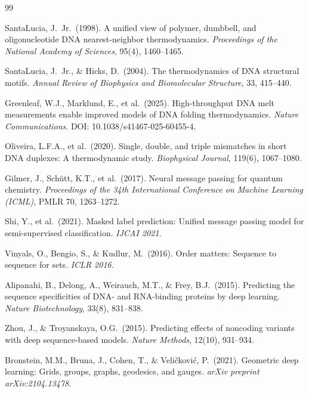 \documentclass[12pt,oneside,letterpaper]{report}
\begin{document}
\clearpage
\begin{singlespace}
\begin{thebibliography}{99}
\setlength{\itemsep}{1em}

SantaLucia, J.\ Jr.\ (1998).
A unified view of polymer, dumbbell, and oligonucleotide DNA nearest-neighbor thermodynamics.
\textit{Proceedings of the National Academy of Sciences}, 95(4), 1460--1465.

SantaLucia, J.\ Jr., \& Hicks, D.\ (2004).
The thermodynamics of DNA structural motifs.
\textit{Annual Review of Biophysics and Biomolecular Structure}, 33, 415--440.

Greenleaf, W.J., Marklund, E., et al.\ (2025).
High-throughput DNA melt measurements enable improved models of DNA folding thermodynamics.
\textit{Nature Communications}. DOI: 10.1038/s41467-025-60455-4.

Oliveira, L.F.A., et al.\ (2020).
Single, double, and triple mismatches in short DNA duplexes: A thermodynamic study.
\textit{Biophysical Journal}, 119(6), 1067--1080.

Gilmer, J., Schütt, K.T., et al.\ (2017).
Neural message passing for quantum chemistry.
\textit{Proceedings of the 34th International Conference on Machine Learning (ICML)}, PMLR 70, 1263--1272.

Shi, Y., et al.\ (2021).
Masked label prediction: Unified message passing model for semi-supervised classification.
\textit{IJCAI 2021}.

Vinyals, O., Bengio, S., \& Kudlur, M.\ (2016).
Order matters: Sequence to sequence for sets.
\textit{ICLR 2016}.

Alipanahi, B., Delong, A., Weirauch, M.T., \& Frey, B.J.\ (2015).
Predicting the sequence specificities of DNA- and RNA-binding proteins by deep learning.
\textit{Nature Biotechnology}, 33(8), 831--838.

Zhou, J., \& Troyanskaya, O.G.\ (2015).
Predicting effects of noncoding variants with deep sequence-based models.
\textit{Nature Methods}, 12(10), 931--934.

Bronstein, M.M., Bruna, J., Cohen, T., \& Veličković, P.\ (2021).
Geometric deep learning: Grids, groups, graphs, geodesics, and gauges.
\textit{arXiv preprint arXiv:2104.13478}.


\end{thebibliography}
\end{singlespace}
\end{document}

